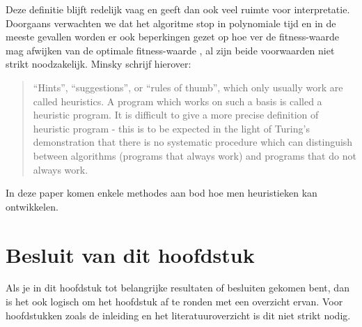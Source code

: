 Deze definitie blijft redelijk vaag en geeft dan ook veel ruimte voor interpretatie. Doorgaans verwachten we dat het algoritme stop in polynomiale tijd en in de meeste gevallen worden er ook beperkingen gezet op hoe ver de fitness-waarde  mag afwijken van de optimale fitness-waarde , al zijn beide voorwaarden niet strikt noodzakelijk. Minsky\cite{minskyHeuristic} schrijf hierover:
\begin{quote}
``Hints'', ``suggestions'', or ``rules of thumb'', which only usually work are called heuristics. A program which works on such a basis is called a heuristic program. It is difficult to give a more precise definition of heuristic program - this is to be expected in the light of Turing's demonstration that there is no systematic procedure which can distinguish between algorithms (programs that always work) and programs that do not always work.
\end{quote}
In deze paper komen enkele methodes aan bod hoe men heuristieken kan ontwikkelen.
\section{Besluit van dit hoofdstuk}
Als je in dit hoofdstuk tot belangrijke resultaten of besluiten gekomen
bent, dan is het ook logisch om het hoofdstuk af te ronden met een
overzicht ervan. Voor hoofdstukken zoals de inleiding en het
literatuuroverzicht is dit niet strikt nodig.

